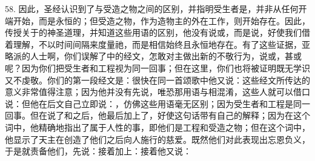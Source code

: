 58. 因此，圣经认识到了与受造之物之间的区别，并指明受生者是，并非从任何开端开始，而是永恒的；但受造之物，作为造物主的外在工作，则开始存在。因此，传授关于的神圣道理，并知道这些用语的区别，他没有说或，而是说，好使我们借着理解，不以时间间隔来度量祂，而是相信始终且永恒地存在。有了这些证据，亚略派的人士啊，你们误解了中的经文，怎敢对主做出新的不敬行为，说或，甚或呢？因为你们把受生者和工程视为同一回事；但在这里，你们也将被证明既无学识又不虔敬。你们的第一段经文是：很快在同一首颂歌中他又说：这些经文所传达的意义非常值得注意；因为他并没有先说，唯恐那用语与相混淆，这些人就可以借口说：但他在后文自己立即说：，仿佛这些用语毫无区别；因为受生者和工程是同一回事。但在说了和之后，他最后加上了，好使这句话带有自己的解释；因为在这个词中，他精确地指出了属于人性的事，即他们是工程和受造之物；但在这个词中，他显示了天主在创造了他们之后向人施行的慈爱。既然他们对此表现出忘恩负义，于是就责备他们，先说：接着加上：接着他又说：\par

